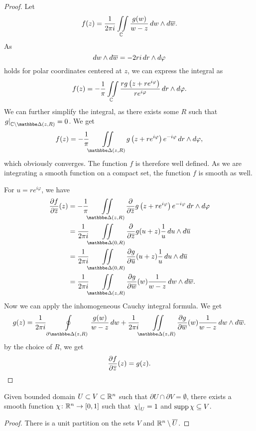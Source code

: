 \begin{proof}
Let
\[
f(z) = \frac{1}{2 \pi i}
\iint\limits_{\mathbb{C}} \frac{g(w)}{w-z}\,dw \wedge d\overline{w}.
\]
As
\[
dw \wedge d\overline{w} = -2ri\,dr \wedge d\varphi
\]
holds for polar coordinates centered at $z$, we can express the
integral as
\[
f(z) = -\frac{1}{\pi}
\iint\limits_{\mathbb{C}} \frac{r g \left(z + r e^{i \varphi}\right)}{r e^{i \varphi}}\,
dr \wedge d\varphi.
\]
We can further simplify the integral, as there exists some $R$
such that $\eval{g}{\C \setminus \dsk(z, R)}{} = 0$. We get
\[
f(z) = -\frac{1}{\pi} \liint_{\dsk(z, R)}
g \br{z + r e^{i \varphi}} e^{-i \varphi}\,dr \wedge d\varphi,
\]
which obviously converges. The function $f$ is therefore well
defined. As we are integrating a smooth function on a compact set,
the function $f$ is smooth as well.

For $u = r e^{i \varphi}$, we have
\begin{align*}
\parc{f}{\oline{z}}(z) &=
-\frac{1}{\pi} \liint_{\dsk(z, R)} \parc{}{\oline{z}}
g \br{z + r e^{i \varphi}} e^{-i \varphi}\,dr \wedge d\varphi
\\
&=
\frac{1}{2 \pi i} \liint_{\dsk(0, R)} \parc{}{\oline{z}}
g(u + z) \frac{1}{u}\,du \wedge d\oline{u}
\\
&=
\frac{1}{2 \pi i} \liint_{\dsk(0, R)}
\parc{g}{\oline{u}}(u+z) \frac{1}{u}\,du \wedge d\oline{u}
\\
&=
\frac{1}{2 \pi i} \liint_{\dsk(z, R)}
\parc{g}{\oline{w}}(w) \frac{1}{w - z}\,dw \wedge d\oline{w}.
\end{align*}
Now we can apply the inhomogeneous Cauchy integral formula. We get
\[
g(z) = \frac{1}{2 \pi i} \olint_{\partial \dsk(z, R)}
\frac{g(w)}{w - z}\,dw + \frac{1}{2 \pi i} \liint_{\dsk(z, R)}
\parc{g}{\oline{w}}(w) \frac{1}{w - z}\,dw \wedge d\oline{w}.
\]
by the choice of $R$, we get
\[
\frac{\partial f}{\partial \overline{z}}(z) = g(z). \qedhere
\]
\end{proof}

\begin{lema}
Given bounded domain $U \subset V \subset \mathbb{R}^n$ such that
$\partial U \cap \partial V = \emptyset$, there exists a smooth
function $\chi \colon \mathbb{R}^n \to [0, 1]$ such that
$\left. \chi\right|_{U}^{} = 1$ and $\operatorname{supp} \chi \subseteq V$.
\end{lema}

\begin{proof}
There is a unit partition on the sets $V$ and
$\mathbb{R}^n \setminus \overline{U}$.
\end{proof}


